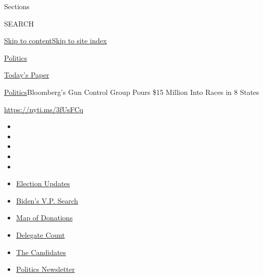 Sections

SEARCH

\protect\hyperlink{site-content}{Skip to
content}\protect\hyperlink{site-index}{Skip to site index}

\href{https://www.nytimes.com/section/politics}{Politics}

\href{https://myaccount.nytimes.com/auth/login?response_type=cookie\&client_id=vi}{}

\href{https://www.nytimes.com/section/todayspaper}{Today's Paper}

\href{/section/politics}{Politics}\textbar{}Bloomberg's Gun Control
Group Pours \$15 Million Into Races in 8 States

\url{https://nyti.ms/3fUsFCq}

\begin{itemize}
\item
\item
\item
\item
\item
\end{itemize}

\begin{itemize}
\item
  \href{https://www.nytimes.com/2020/08/04/us/elections/primary-election-michigan-arizona-kansas.html?action=click\&pgtype=Article\&state=default\&region=TOP_BANNER\&context=storylines_menu}{Election
  Updates}
\item
  \href{https://www.nytimes.com/article/biden-vice-president-2020.html?action=click\&pgtype=Article\&state=default\&region=TOP_BANNER\&context=storylines_menu}{Biden's
  V.P. Search}
\item
  \href{https://www.nytimes.com/interactive/2020/07/24/us/politics/trump-biden-campaign-donors.html?action=click\&pgtype=Article\&state=default\&region=TOP_BANNER\&context=storylines_menu}{Map
  of Donations}
\item
  \href{https://www.nytimes.com/interactive/2020/us/elections/delegate-count-primary-results.html?action=click\&pgtype=Article\&state=default\&region=TOP_BANNER\&context=storylines_menu}{Delegate
  Count}
\item
  \href{https://www.nytimes.com/interactive/2019/us/politics/2020-presidential-candidates.html?action=click\&pgtype=Article\&state=default\&region=TOP_BANNER\&context=storylines_menu}{The
  Candidates}
\item
  \href{https://www.nytimes.com/newsletters/politics?action=click\&pgtype=Article\&state=default\&region=TOP_BANNER\&context=storylines_menu}{Politics
  Newsletter}
\end{itemize}

